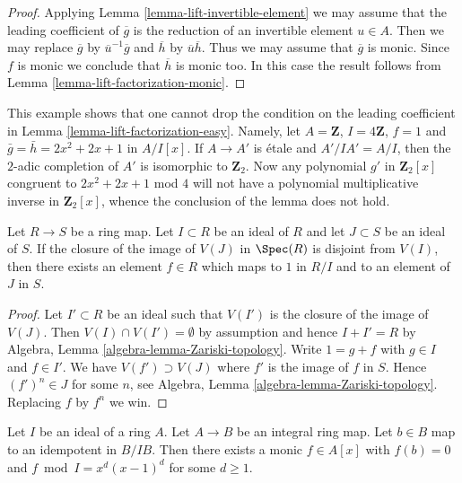 \begin{proof}
Applying Lemma \ref{lemma-lift-invertible-element} we may assume that
the leading coefficient of $\overline{g}$ is the reduction of an
invertible element $u \in A$. Then we may replace $\overline{g}$ by
$\overline{u}^{-1}\overline{g}$ and $\overline{h}$ by
$\overline{u}\overline{h}$. Thus we may assume that $\overline{g}$
is monic. Since $f$ is monic we conclude that $\overline{h}$ is monic
too. In this case the result follows from
Lemma \ref{lemma-lift-factorization-monic}.
\end{proof}

\begin{example}
\label{example-cannot-lift-factorization}
This example shows that one cannot drop the condition on the leading
coefficient in Lemma \ref{lemma-lift-factorization-easy}. Namely,
let $A = \mathbf{Z}$, $I = 4\mathbf{Z}$, $f = 1$ and
$\bar{g} = \bar{h} = 2x^2 + 2x + 1$ in $A/I[x]$. If $A \to A'$ is \'etale
and $A'/I A' = A/I$, then the $2$-adic completion of $A'$ is isomorphic
to $\mathbf{Z}_2$. Now any polynomial $g'$ in $\mathbf{Z}_2[x]$ congruent
to $2x^2 + 2x + 1$ mod $4$ will not have a polynomial multiplicative
inverse in $\mathbf{Z}_2[x]$, whence the conclusion of the lemma does
not hold.
\end{example}

\begin{lemma}
\label{lemma-separate-image-closed-from-closed}
Let $R \to S$ be a ring map. Let $I \subset R$ be an ideal of $R$
and let $J \subset S$ be an ideal of $S$. If the closure of the image
of $V(J)$ in $\Spec(R)$ is disjoint from $V(I)$, then there exists
an element $f \in R$ which maps to $1$ in $R/I$ and to an element
of $J$ in $S$.
\end{lemma}

\begin{proof}
Let $I' \subset R$ be an ideal such that $V(I')$ is the closure of
the image of $V(J)$. Then $V(I) \cap V(I') = \emptyset$ by assumption
and hence $I + I' = R$ by
Algebra, Lemma \ref{algebra-lemma-Zariski-topology}.
Write $1 = g + f$ with $g \in I$ and $f \in I'$.
We have $V(f') \supset V(J)$ where $f'$ is the image of $f$ in $S$.
Hence $(f')^n \in J$ for some $n$, see
Algebra, Lemma \ref{algebra-lemma-Zariski-topology}.
Replacing $f$ by $f^n$ we win.
\end{proof}

\begin{lemma}
\label{lemma-helper-integral}
Let $I$ be an ideal of a ring $A$. Let $A \to B$ be an integral ring map.
Let $b \in B$ map to an idempotent in $B/IB$. Then there exists a
monic $f \in A[x]$ with $f(b) = 0$ and $f \bmod I = x^d(x - 1)^d$
for some $d \geq 1$.
\end{lemma}

